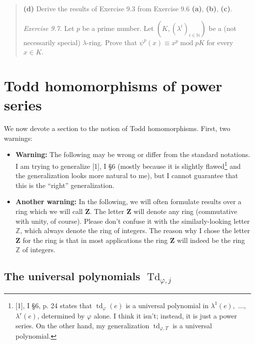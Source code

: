 \documentclass[numbers=enddot,12pt,final,onecolumn,notitlepage]{scrartcl}%
\begin{document}
\begin{quotation}
\textbf{(d)} Derive the results of Exercise 9.3 from Exercise 9.6
\textbf{(a)}, \textbf{(b)}, \textbf{(c)}.

\textit{Exercise 9.7.} Let $p$ be a prime number. Let $\left(  K,\left(
\lambda^{i}\right)  _{i\in\mathbb{N}}\right)  $ be a (not necessarily special)
$\lambda$-ring. Prove that $\psi^{p}\left(  x\right)  \equiv x^{p}%
\operatorname{mod}pK$ for every $x\in K$.

\bigskip
\end{quotation}

\section{Todd homomorphisms of power series}

We now devote a section to the notion of Todd homomorphisms. First, two warnings:

\begin{itemize}
\item \textbf{Warning:} The following may be wrong or differ from the standard
notations. I am trying to generalize [1], I \S 6 (mostly because it is
slightly flawed\footnote{[1], I \S 6, p. 24 states that $\operatorname*{td}%
_{\varphi}\left(  e\right)  $ is a universal polynomial in $\lambda^{1}\left(
e\right)  ,$ $...,$ $\lambda^{r}\left(  e\right)  $, determined by $\varphi$
alone. I think it isn't; instead, it is just a power series. On the other
hand, my generalization $\operatorname*{td}\nolimits_{\varphi,T}$ is a
universal polynomial.} and the generalization looks more natural to me), but I
cannot guarantee that this is the ``right'' generalization.

\item \textbf{Another warning:} In the following, we will often formulate
results over a ring which we will call $\mathbf{Z}$. The letter $\mathbf{Z}$
will denote any ring (commutative with unity, of course). Please don't confuse
it with the similarly-looking letter $\mathbb{Z}$, which always denote the
ring of integers. The reason why I chose the letter $\mathbf{Z}$ for the ring
is that in most applications the ring $\mathbf{Z}$ will indeed be the ring
$\mathbb{Z}$ of integers.
\end{itemize}

\subsection{The universal polynomials $\operatorname*{Td}\nolimits_{\varphi
,j}$}
\end{document}
